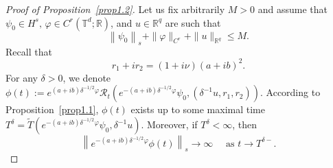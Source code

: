 \documentclass[review]{elsarticle}
\theoremstyle{dotless}
\def \leq{\leqslant}
\numberwithin{equation}{section}
\begin{document}
\begin{proof}[Proof of Proposition~\ref{prop1.2}]
Let us fix arbitrarily $M>0$ and assume that $\psi_0 \in H^s,\, \varphi \in C^r\left(\mathbb{T}^d ; \mathbb{R}\right)$, and $u \in \mathbb{R}^q$ are such that
\begin{equation}\label{(3.1)}
	\left\|\psi_0\right\|_s+\|\varphi\|_{C^r}+\|u\|_{\mathbb{R}^q} \leq M.
\end{equation}
Recall that $$ r_1+ir_2=(1+i\nu)(a+ib)^2. $$
For any $\delta>0$, we denote $\phi(t):=e^{(a+ib) \delta^{-1 / 2} \varphi} \mathcal{R}_t\left(e^{-(a+ib) \delta^{-1 / 2} \varphi} \psi_0, (\delta^{-1} u,r_1,r_2)\right)$. According to Proposition~\ref{prop1.1}, $\phi(t)$ exists up to some maximal time $T^\delta=\tilde{T}\left(e^{-(a+ib) \delta^{-1 / 2} \varphi} \psi_0, \delta^{-1} u\right)$. Moreover, if $T^\delta<\infty$, then
$$
\left\|e^{-(a+ib) \delta^{-1 / 2} \varphi} \phi(t)\right\|_s \rightarrow \infty \quad \text { as } t \rightarrow T^{\delta-}.
$$


\end{proof}
\end{document}
